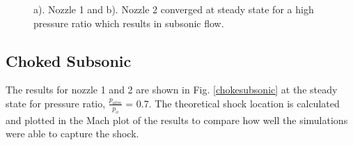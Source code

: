 \documentclass{article}%
\numberwithin{equation}{section}
\begin{document}
\begin{figure}[h!]
\caption{a). Nozzle 1 and b). Nozzle 2 converged at steady state for a high pressure ratio which results in subsonic flow. \label{subsonic}}
\end{figure}

\subsection{Choked Subsonic}
The results for nozzle 1 and 2 are shown in Fig. \ref{chokesubsonic} at the steady state for pressure ratio, $\frac{p_{atm}}{p_o}$ = 0.7. The theoretical shock location is calculated and plotted in the Mach plot of the results to compare how well the simulations were able to capture the shock.
\end{document}
